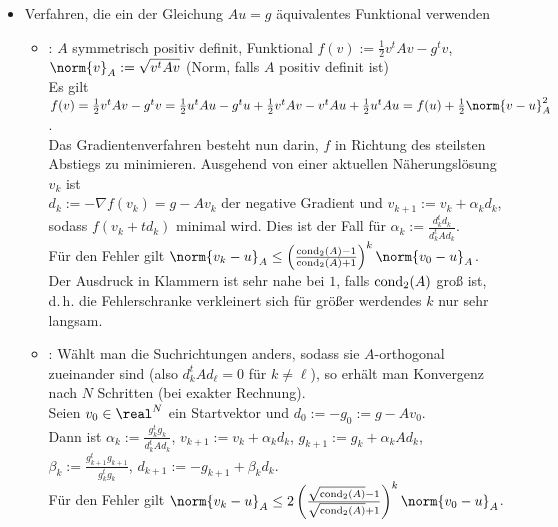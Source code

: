 \begin{Bem}
\begin{itemize}
        \item
        Verfahren, die ein der Gleichung $Au = g$ äquivalentes Funktional
        verwenden
        \begin{itemize}
            \item
            :
            $A$ symmetrisch positiv definit,
            Funktional $f(v) := \frac{1}{2} v^t A v - g^t v$,
             $\norm{v}_A := \sqrt{v^t A v}$
            (Norm, falls $A$ positiv definit ist)\\
            Es gilt $f(v) = \frac{1}{2} v^t A v - g^t v =
            \frac{1}{2} u^t A u - g^t u +
            \frac{1}{2} v^t A v - v^t A u + \frac{1}{2} u^t A u =
            f(u) + \frac{1}{2} \norm{v - u}_A^2$.\\
            Das Gradientenverfahren besteht nun darin, $f$ in Richtung
            des steilsten Abstiegs zu minimieren.
            Ausgehend von einer aktuellen Näherungslösung $v_k$ ist\\
            $d_k := -\nabla f(v_k) = g - Av_k$
            der negative Gradient und
            $v_{k+1} := v_k + \alpha_k d_k$, sodass
            $f(v_k + t d_k)$ minimal wird.
            Dies ist der Fall für
            $\alpha_k := \frac{d_k^t d_k}{d_k^t A d_k}$.\\
            Für den Fehler gilt
            $\norm{v_k - u}_A \le
            \left(\frac{\cond_2(A) - 1}{\cond_2(A) + 1}\right)^k
            \norm{v_0 - u}_A$.
            Der Ausdruck in Klammern ist sehr nahe bei $1$, falls
            $\operatorname{cond}_2(A)$ groß ist,
            d.\,h. die Fehlerschranke verkleinert sich für größer werdendes $k$
            nur sehr langsam.
            
            \item
            :
            Wählt man die Suchrichtungen anders, sodass sie $A$-orthogonal
            zueinander sind (also $d_k^t A d_\ell = 0$ für $k \not= \ell$),
            so erhält man Konvergenz nach $N$ Schritten
            (bei exakter Rechnung).\\
            Seien $v_0 \in \real^N$ ein Startvektor und
            $d_0 := -g_0 := g - Av_0$.\\
            Dann ist
            $\alpha_k := \frac{g_k^t g_k}{d_k^t A d_k}$,\qquad
            $v_{k+1} := v_k + \alpha_k d_k$,\qquad
            $g_{k+1} := g_k + \alpha_k A d_k$,\\
            $\beta_k := \frac{g_{k+1}^t g_{k+1}}{g_k^t g_k}$,\qquad
            $d_{k+1} := -g_{k+1} + \beta_k d_k$.\\
            Für den Fehler gilt
            $\norm{v_k - u}_A \le
            2 \left(\frac{\sqrt{\cond_2(A)} - 1}
            {\sqrt{\cond_2(A)} + 1}\right)^k \norm{v_0 - u}_A$.
            

\end{itemize}
\end{itemize}
\end{Bem}
